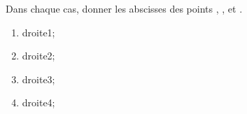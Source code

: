 \documentclass[exercice]{thedocument}%
\begin{document}
%
Dans chaque cas, donner les abscisses des points , , 
et .
\begin{enumerate}
        \item \vskip10pt\noindent\<droite1;\vskip10pt
        \item \vskip10pt\noindent\<droite2;\vskip10pt
        \item \<droite3;
        \item \<droite4;
\end{enumerate}
\end{document}
